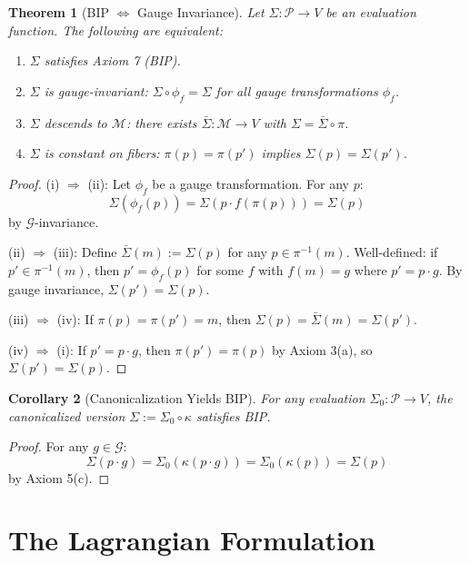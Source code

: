 \documentclass[11pt]{article}
\newtheorem{theorem}{Theorem}[section]
\newtheorem{corollary}[theorem]{Corollary}
\begin{document}
\begin{theorem}[BIP $\Leftrightarrow$ Gauge Invariance]
\label{thm:equivalence}
Let $\Sigma : \mathcal{P} \to V$ be an evaluation function. The
following are equivalent:
\begin{enumerate}
    \item[(i)] $\Sigma$ satisfies Axiom 7 (BIP).
    \item[(ii)] $\Sigma$ is gauge-invariant: $\Sigma \circ \phi_f = \Sigma$ for all gauge transformations $\phi_f$.
    \item[(iii)] $\Sigma$ descends to $\mathcal{M}$: there exists $\bar{\Sigma} : \mathcal{M} \to V$ with $\Sigma = \bar{\Sigma} \circ \pi$.
    \item[(iv)] $\Sigma$ is constant on fibers: $\pi(p) = \pi(p')$ implies $\Sigma(p) = \Sigma(p')$.
\end{enumerate}
\end{theorem}

\begin{proof}
(i) $\Rightarrow$ (ii): Let $\phi_f$ be a gauge transformation. For any $p$:
\[
\Sigma(\phi_f(p)) = \Sigma(p \cdot f(\pi(p))) = \Sigma(p)
\]
by $\mathcal{G}$-invariance.

(ii) $\Rightarrow$ (iii): Define $\bar{\Sigma}(m) := \Sigma(p)$ for any $p \in \pi^{-1}(m)$. Well-defined: if $p' \in \pi^{-1}(m)$, then
$p' = \phi_f(p)$ for some $f$ with $f(m) = g$ where $p' = p \cdot g$. By gauge invariance, $\Sigma(p') = \Sigma(p)$.

(iii) $\Rightarrow$ (iv): If $\pi(p) = \pi(p') = m$, then $\Sigma(p) = \bar{\Sigma}(m) = \Sigma(p')$.

(iv) $\Rightarrow$ (i): If $p' = p \cdot g$, then $\pi(p') = \pi(p)$ by Axiom 3(a), so $\Sigma(p') = \Sigma(p)$.
\end{proof}

\begin{corollary}[Canonicalization Yields BIP]
For any evaluation $\Sigma_0 : \mathcal{P} \to V$, the
canonicalized version $\Sigma := \Sigma_0 \circ \kappa$ satisfies BIP.
\end{corollary}

\begin{proof}
For any $g \in \mathcal{G}$:
\[
\Sigma(p \cdot g) = \Sigma_0(\kappa(p \cdot g)) = \Sigma_0(\kappa(p)) = \Sigma(p)
\]
by Axiom 5(c).
\end{proof}

\section{The Lagrangian Formulation}
\end{document}
